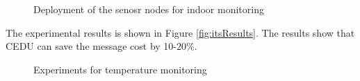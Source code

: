 \begin{figure}
\centering
{}
\caption{Deployment of the senosr nodes for indoor monitoring}
\label{fig:indoorDeployment}
\end{figure}

The experimental results is shown in Figure \ref{fig:itsResults}. The results show that CEDU can save the message cost by 10-20\%.

\begin{figure}
\centering
{}
\caption{Experiments for temperature monitoring}
\label{fig:indoorResult}
\end{figure}